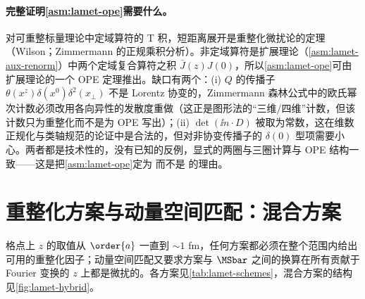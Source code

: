 \paragraph{完整证明\cref{asm:lamet-ope}需要什么。}
对可重整标量理论中定域算符的 T 积，短距离展开是重整化微扰论的定理（Wilson\cite{Wilson1969}；Zimmermann 的正规乘积分析\cite{Zimmermann1973}）。非定域算符是扩展理论（\cref{asm:lamet-aux-renorm}）中两个定域复合算符之积 $\bar J(z)J(0)$，所以\cref{asm:lamet-ope}可由扩展理论的一个 OPE 定理推出。缺口有两个：(i) $Q$ 的传播子 $\theta(x^z)\delta(x^0)\delta^2(x_\perp)$ 不是 Lorentz 协变的，Zimmermann 森林公式中的欧氏幂次计数必须改用各向异性的发散度重做（这正是图形法的“三维/四维”计数，但该计数只为重整化而不是为 OPE 写出）；(ii) $\det(\ii n\cdot D)$ 被取为常数，这在维数正规化与类轴规范的论证中是合法的，但对非协变传播子的 $\delta(0)$ 型项需要小心。两者都是技术性的，没有已知的反例，显式的两圈与三圈计算与 OPE 结构一致——这是把\cref{asm:lamet-ope}定为 \tagA 而不是 \tagC 的理由。

\section{重整化方案与动量空间匹配：混合方案}\label{sec:lamet-schemes}

格点上 $z$ 的取值从 $\order{a}$ 一直到 $\sim1$ fm，任何方案都必须在整个范围内给出可用的重整化因子；动量空间匹配又要求方案与 $\MSbar$ 之间的换算在所有贡献于 Fourier 变换的 $z$ 上都是微扰的。各方案见\cref{tab:lamet-schemes}，混合方案的结构见\cref{fig:lamet-hybrid}。

